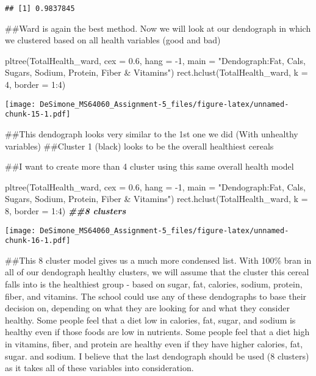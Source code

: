 \documentclass[
]{article}
\newenvironment{Shaded}{\begin{snugshade}}{\end{snugshade}}
\newcommand{\AttributeTok}[1]{\textcolor[rgb]{0.77,0.63,0.00}{#1}}
\newcommand{\DecValTok}[1]{\textcolor[rgb]{0.00,0.00,0.81}{#1}}
\newcommand{\DocumentationTok}[1]{\textcolor[rgb]{0.56,0.35,0.01}{\textbf{\textit{#1}}}}
\newcommand{\FloatTok}[1]{\textcolor[rgb]{0.00,0.00,0.81}{#1}}
\newcommand{\FunctionTok}[1]{\textcolor[rgb]{0.00,0.00,0.00}{#1}}
\newcommand{\NormalTok}[1]{#1}
\newcommand{\SpecialCharTok}[1]{\textcolor[rgb]{0.00,0.00,0.00}{#1}}
\newcommand{\StringTok}[1]{\textcolor[rgb]{0.31,0.60,0.02}{#1}}
\begin{document}
\begin{verbatim}
## [1] 0.9837845
\end{verbatim}

\#\#Ward is again the best method. Now we will look at our dendograph in
which we clustered based on all health variables (good and bad)

\begin{Shaded}
\begin{Highlighting}[]
\FunctionTok{pltree}\NormalTok{(TotalHealth\_ward, }\AttributeTok{cex =} \FloatTok{0.6}\NormalTok{, }\AttributeTok{hang =} \SpecialCharTok{{-}}\DecValTok{1}\NormalTok{, }\AttributeTok{main =} \StringTok{"Dendograph:Fat, Cals, Sugars, Sodium, Protein, Fiber \& Vitamins"}\NormalTok{)}
\FunctionTok{rect.hclust}\NormalTok{(TotalHealth\_ward, }\AttributeTok{k =} \DecValTok{4}\NormalTok{, }\AttributeTok{border =} \DecValTok{1}\SpecialCharTok{:}\DecValTok{4}\NormalTok{)}
\end{Highlighting}
\end{Shaded}

\texttt{[image: DeSimone\_MS64060\_Assignment-5\_files/figure-latex/unnamed-chunk-15-1.pdf]}

\#\#This dendograph looks very similar to the 1st one we did (With
unhealthy variables) \#\#Cluster 1 (black) looks to be the overall
healthiest cereals

\#\#I want to create more than 4 cluster using this same overall health
model

\begin{Shaded}
\begin{Highlighting}[]
\FunctionTok{pltree}\NormalTok{(TotalHealth\_ward, }\AttributeTok{cex =} \FloatTok{0.6}\NormalTok{, }\AttributeTok{hang =} \SpecialCharTok{{-}}\DecValTok{1}\NormalTok{, }\AttributeTok{main =} \StringTok{"Dendograph:Fat, Cals, Sugars, Sodium, Protein, Fiber \& Vitamins"}\NormalTok{)}
\FunctionTok{rect.hclust}\NormalTok{(TotalHealth\_ward, }\AttributeTok{k =} \DecValTok{8}\NormalTok{, }\AttributeTok{border =} \DecValTok{1}\SpecialCharTok{:}\DecValTok{4}\NormalTok{) }\DocumentationTok{\#\#8 clusters}
\end{Highlighting}
\end{Shaded}

\texttt{[image: DeSimone\_MS64060\_Assignment-5\_files/figure-latex/unnamed-chunk-16-1.pdf]}

\#\#This 8 cluster model gives us a much more condensed list. With 100\%
bran in all of our dendograph healthy clusters, we will assume that the
cluster this cereal falls into is the healthiest group - based on sugar,
fat, calories, sodium, protein, fiber, and vitamins. The school could
use any of these dendographs to base their decision on, depending on
what they are looking for and what they consider healthy. Some people
feel that a diet low in calories, fat, sugar, and sodium is healthy even
if those foods are low in nutrients. Some people feel that a diet high
in vitamins, fiber, and protein are healthy even if they have higher
calories, fat, sugar. and sodium. I believe that the last dendograph
should be used (8 clusters) as it takes all of these variables into
consideration.
\end{document}
